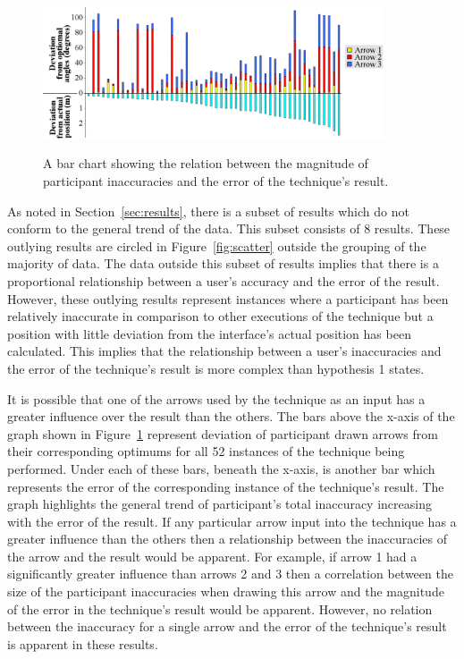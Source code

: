 \documentclass{bmcart}
\begin{document}
\begin{figure}[bp]
   \centering
   \caption{A bar chart showing the relation between the magnitude of participant inaccuracies and the error of the technique's result.}
   \includegraphics[width=0.9\textwidth]{figures/total_deviation_vs_angle_deviations.png}
   \label{fig:barReflect}
\end{figure}

As noted in Section~\ref{sec:results}, there is a subset of results which do not conform to the general trend of the data.
This subset consists of 8 results.
These outlying results are circled in Figure~\ref{fig:scatter} outside the grouping of the majority of data.
The data outside this subset of results implies that there is a proportional relationship between a user's accuracy and the error of the result.
However, these outlying results represent instances where a participant has been relatively inaccurate in comparison to other executions of the technique but a position with little deviation from the interface's actual position has been calculated.
This implies that the relationship between a user's inaccuracies and the error of the technique's result is more complex than hypothesis 1 states.

It is possible that one of the arrows used by the technique as an input has a greater influence over the result than the others.
The bars above the x-axis of the graph shown in Figure~\ref{fig:barReflect} represent deviation of participant drawn arrows from their corresponding optimums for all 52 instances of the technique being performed.
Under each of these bars, beneath the x-axis, is another bar which represents the error of the corresponding instance of the technique's result.
The graph highlights the general trend of participant's total inaccuracy increasing with the error of the result.
If any particular arrow input into the technique has a greater influence than the others then a relationship between the inaccuracies of the arrow and the result would be apparent.
For example, if arrow 1 had a significantly greater influence than arrows 2 and 3 then a correlation between the size of the participant inaccuracies when drawing this arrow and the magnitude of the error in the technique's result would be apparent.
However, no relation between the inaccuracy for a single arrow and the error of the technique's result is apparent in these results.
\end{document}
